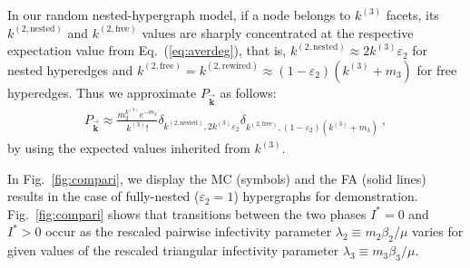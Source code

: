 \documentclass[aps,pre,twocolumn,nofootinbib,superscriptaddress,showpacs,showkeys]{revtex4-1}
\begin{document}
In our random nested-hypergraph model, if a node belongs to $k^{(3)}$ facets, its $k^{(2,\mathrm{nested})}$ and $k^{(2,\mathrm{free})}$ values are sharply concentrated at the respective expectation value from Eq.~(\ref{eq:averdeg}), that is, $k^{(2,\mathrm{nested})}\approx 2k^{(3)}\varepsilon_2$ for nested hyperedges and $k^{(2,\mathrm{free})}=k^{(2,\mathrm{rewired})}\approx (1-\varepsilon_2)(k^{(3)}+m_{3})$ for free hyperedges. 
Thus we approximate $P_{\vec{\mathbf{k}}}$ as follows: 
\begin{equation}
\begin{array}{ll}
P_{\vec{\mathbf{k}}}\approx \frac{m^{k^{(3)}}_3 e^{-m_3}}{k^{(3)} !}\delta_{k^{(2,\mathrm{nested})},2k^{(3)}\varepsilon_2}\delta_{k^{(2,\mathrm{free})},(1-\varepsilon_2)(k^{(3)}+m_{3})}~,
\end{array}
\end{equation}
by using the expected values inherited from $k^{(3)}$.

In Fig.~\ref{fig:compari}, we display the MC (symbols) and the FA (solid lines) results in the case of fully-nested ($\varepsilon_2=1$) hypergraphs for demonstration. 
Fig.~\ref{fig:compari} shows that transitions between the two phases $I^*=0$ and $I^*>0$ occur as the rescaled pairwise infectivity parameter $\lambda_2\equiv m_2\beta_2/\mu$ varies for given values of the rescaled triangular infectivity parameter $\lambda_3\equiv m_3\beta_3/\mu$.  
\end{document}
